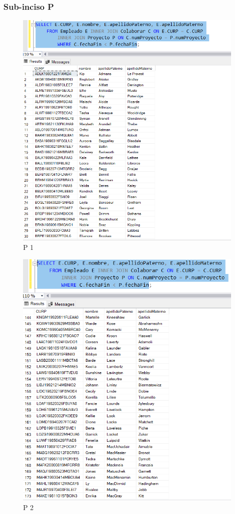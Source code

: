 \documentclass[a4paper, 12pt]{report}
\begin{document}
\subsubsection*{Sub-inciso P}
    \begin{figure}
        \includegraphics[width=\textwidth]
            {img/P.png}\hfill
    \caption{P 1}
    \end{figure}
    \begin{figure}
        \includegraphics[width=\textwidth]
            {img/P2.png}\hfill
    \caption{P 2}
    \end{figure}
\end{document}
